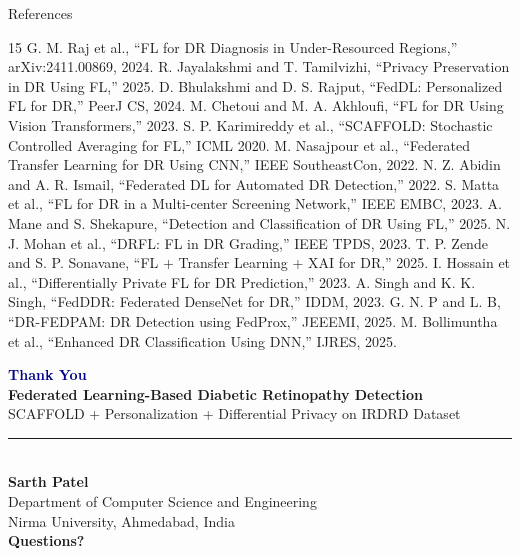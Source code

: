 \documentclass[aspectratio=169, 11pt]{beamer}
\begin{document}
\begin{frame}[allowframebreaks]{References}
  {\footnotesize
  \begin{thebibliography}{15}
     G. M. Raj et al., ``FL for DR Diagnosis in Under-Resourced Regions,'' arXiv:2411.00869, 2024.
     R. Jayalakshmi and T. Tamilvizhi, ``Privacy Preservation in DR Using FL,'' 2025.
     D. Bhulakshmi and D. S. Rajput, ``FedDL: Personalized FL for DR,'' PeerJ CS, 2024.
     M. Chetoui and M. A. Akhloufi, ``FL for DR Using Vision Transformers,'' 2023.
     S. P. Karimireddy et al., ``SCAFFOLD: Stochastic Controlled Averaging for FL,'' ICML 2020.
     M. Nasajpour et al., ``Federated Transfer Learning for DR Using CNN,'' IEEE SoutheastCon, 2022.
     N. Z. Abidin and A. R. Ismail, ``Federated DL for Automated DR Detection,'' 2022.
     S. Matta et al., ``FL for DR in a Multi-center Screening Network,'' IEEE EMBC, 2023.
     A. Mane and S. Shekapure, ``Detection and Classification of DR Using FL,'' 2025.
     N. J. Mohan et al., ``DRFL: FL in DR Grading,'' IEEE TPDS, 2023.
     T. P. Zende and S. P. Sonavane, ``FL + Transfer Learning + XAI for DR,'' 2025.
     I. Hossain et al., ``Differentially Private FL for DR Prediction,'' 2023.
     A. Singh and K. K. Singh, ``FedDDR: Federated DenseNet for DR,'' IDDM, 2023.
     G. N. P and L. B, ``DR-FEDPAM: DR Detection using FedProx,'' JEEEMI, 2025.
     M. Bollimuntha et al., ``Enhanced DR Classification Using DNN,'' IJRES, 2025.
  \end{thebibliography}
  }
\end{frame}

\begin{frame}
  \vspace{10pt}
  \begin{center}
    {\Huge \textbf{\textcolor{darkblue}{Thank You}}}\\[16pt]
    {\large \textbf{Federated Learning-Based Diabetic Retinopathy Detection}}\\[6pt]
    {\normalsize SCAFFOLD + Personalization + Differential Privacy on IRDRD Dataset}\\[16pt]
    \textcolor{darkblue}{\rule{0.7\textwidth}{0.5pt}}\\[12pt]
    \textbf{Sarth Patel}\\
    Department of Computer Science and Engineering\\
    Nirma University, Ahmedabad, India\\[12pt]
    {\large \textbf{Questions?}}
  \end{center}
\end{frame}

\end{document}
